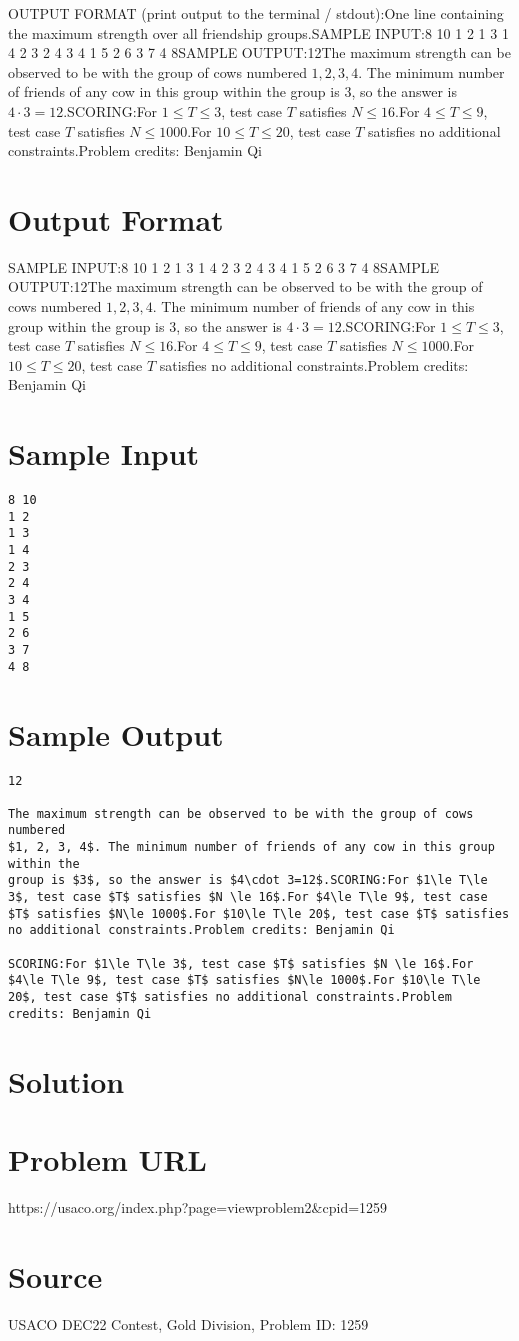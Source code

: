 \documentclass[12pt]{article}
\begin{document}
OUTPUT FORMAT (print output to the terminal / stdout):One line containing the maximum strength over all friendship groups.SAMPLE INPUT:8 10
1 2
1 3
1 4
2 3
2 4
3 4
1 5
2 6
3 7
4 8SAMPLE OUTPUT:12The maximum strength can be observed to be with the group of cows numbered
$1, 2, 3, 4$. The minimum number of friends of any cow in this group within the
group is $3$, so the answer is $4\cdot 3=12$.SCORING:For $1\le T\le 3$, test case $T$ satisfies $N \le 16$.For $4\le T\le 9$, test case $T$ satisfies $N\le 1000$.For $10\le T\le 20$, test case $T$ satisfies no additional constraints.Problem credits: Benjamin Qi

\section*{Output Format}
SAMPLE INPUT:8 10
1 2
1 3
1 4
2 3
2 4
3 4
1 5
2 6
3 7
4 8SAMPLE OUTPUT:12The maximum strength can be observed to be with the group of cows numbered
$1, 2, 3, 4$. The minimum number of friends of any cow in this group within the
group is $3$, so the answer is $4\cdot 3=12$.SCORING:For $1\le T\le 3$, test case $T$ satisfies $N \le 16$.For $4\le T\le 9$, test case $T$ satisfies $N\le 1000$.For $10\le T\le 20$, test case $T$ satisfies no additional constraints.Problem credits: Benjamin Qi

\section*{Sample Input}
\begin{verbatim}
8 10
1 2
1 3
1 4
2 3
2 4
3 4
1 5
2 6
3 7
4 8
\end{verbatim}

\section*{Sample Output}
\begin{verbatim}
12

The maximum strength can be observed to be with the group of cows numbered
$1, 2, 3, 4$. The minimum number of friends of any cow in this group within the
group is $3$, so the answer is $4\cdot 3=12$.SCORING:For $1\le T\le 3$, test case $T$ satisfies $N \le 16$.For $4\le T\le 9$, test case $T$ satisfies $N\le 1000$.For $10\le T\le 20$, test case $T$ satisfies no additional constraints.Problem credits: Benjamin Qi

SCORING:For $1\le T\le 3$, test case $T$ satisfies $N \le 16$.For $4\le T\le 9$, test case $T$ satisfies $N\le 1000$.For $10\le T\le 20$, test case $T$ satisfies no additional constraints.Problem credits: Benjamin Qi
\end{verbatim}

\section*{Solution}


\section*{Problem URL}
https://usaco.org/index.php?page=viewproblem2&cpid=1259

\section*{Source}
USACO DEC22 Contest, Gold Division, Problem ID: 1259
\end{document}
